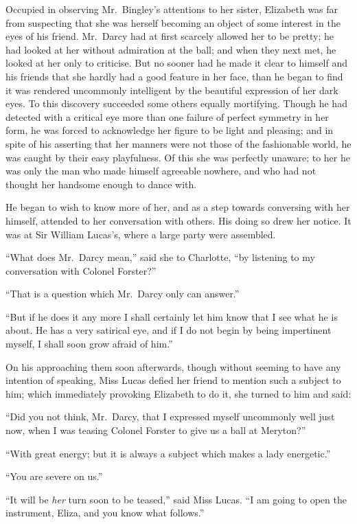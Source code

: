 \documentclass[12pt,english]{book}
\begin{document}
Occupied in observing Mr.\ Bingley's attentions to her sister, Elizabeth
was far from suspecting that she was herself becoming an object of
some interest in the eyes of his friend. Mr.\ Darcy had at first
scarcely allowed her to be pretty; he had looked at her without admiration
at the ball; and when they next met, he looked at her only to criticise.
But no sooner had he made it clear to himself and his friends that
she hardly had a good feature in her face, than he began to find it
was rendered uncommonly intelligent by the beautiful expression of
her dark eyes. To this discovery succeeded some others equally mortifying.
Though he had detected with a critical eye more than one failure of
perfect symmetry in her form, he was forced to acknowledge her figure
to be light and pleasing; and in spite of his asserting that her manners
were not those of the fashionable world, he was caught by their easy
playfulness. Of this she was perfectly unaware; to her he was only
the man who made himself agreeable nowhere, and who had not thought
her handsome enough to dance with.

He began to wish to know more of her, and as a step towards conversing
with her himself, attended to her conversation with others. His doing
so drew her notice. It was at Sir William Lucas's, where a large party
were assembled.

{}``What does Mr.\ Darcy mean,'' said she to Charlotte, {}``by
listening to my conversation with Colonel Forster?''\ 

{}``That is a question which Mr.\ Darcy only can answer.''

{}``But if he does it any more I shall certainly let him know that
I see what he is about. He has a very satirical eye, and if I do not
begin by being impertinent myself, I shall soon grow afraid of him.''

On his approaching them soon afterwards, though without seeming to
have any intention of speaking, Miss Lucas defied her friend to mention
such a subject to him; which immediately provoking Elizabeth to do
it, she turned to him and said:

{}``Did you not think, Mr.\ Darcy, that I expressed myself uncommonly
well just now, when I was teasing Colonel Forster to give us a ball
at Meryton?''\ 

{}``With great energy; but it is always a subject which makes a lady
energetic.''

{}``You are severe on us.''

{}``It will be \textit{her} turn soon to be teased,'' said Miss
Lucas. {}``I am going to open the instrument, Eliza, and you know
what follows.''
\end{document}
